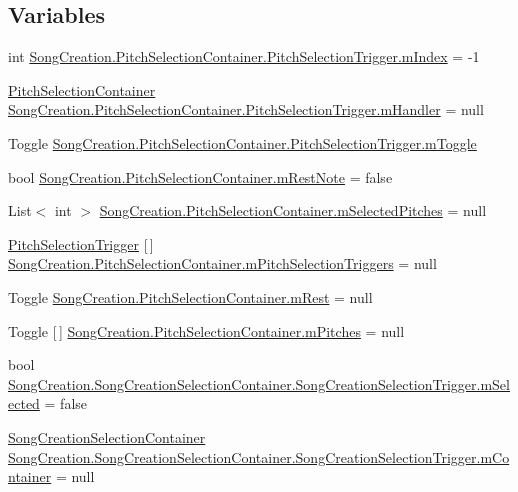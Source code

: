 \subsection*{Variables}
\begin{DoxyCompactItemize}
\item 
int \hyperlink{group___s_c_handlers_ga6fa7a0883292035fef62858a69044010}{Song\+Creation.\+Pitch\+Selection\+Container.\+Pitch\+Selection\+Trigger.\+m\+Index} = -\/1
\item 
\hyperlink{class_song_creation_1_1_pitch_selection_container}{Pitch\+Selection\+Container} \hyperlink{group___s_c_handlers_gaad92d071482ccc179c9a40cada09785b}{Song\+Creation.\+Pitch\+Selection\+Container.\+Pitch\+Selection\+Trigger.\+m\+Handler} = null
\item 
Toggle \hyperlink{group___s_c_handlers_gaa289269d96356379b79d3918535561fd}{Song\+Creation.\+Pitch\+Selection\+Container.\+Pitch\+Selection\+Trigger.\+m\+Toggle}
\item 
bool \hyperlink{group___s_c_handlers_gace289a908db9ba443c50ec8656ae05b1}{Song\+Creation.\+Pitch\+Selection\+Container.\+m\+Rest\+Note} = false
\item 
List$<$ int $>$ \hyperlink{group___s_c_handlers_ga816236cbae1f13ea34be94fb1b86b7cd}{Song\+Creation.\+Pitch\+Selection\+Container.\+m\+Selected\+Pitches} = null
\item 
\hyperlink{group___s_c_handlers_class_song_creation_1_1_pitch_selection_container_1_1_pitch_selection_trigger}{Pitch\+Selection\+Trigger} \mbox{[}$\,$\mbox{]} \hyperlink{group___s_c_handlers_ga1affedf973b4aa39505b35053c12df7e}{Song\+Creation.\+Pitch\+Selection\+Container.\+m\+Pitch\+Selection\+Triggers} = null
\item 
Toggle \hyperlink{group___s_c_handlers_ga41e99d322cb92a3eb304bef704af2b7a}{Song\+Creation.\+Pitch\+Selection\+Container.\+m\+Rest} = null
\item 
Toggle \mbox{[}$\,$\mbox{]} \hyperlink{group___s_c_handlers_ga19dbd38f92df12e9b3d52b01634fdc53}{Song\+Creation.\+Pitch\+Selection\+Container.\+m\+Pitches} = null
\item 
bool \hyperlink{group___s_c_handlers_ga49ffd4516ec7982b1683a44b4f22de74}{Song\+Creation.\+Song\+Creation\+Selection\+Container.\+Song\+Creation\+Selection\+Trigger.\+m\+Selected} = false
\item 
\hyperlink{class_song_creation_1_1_song_creation_selection_container}{Song\+Creation\+Selection\+Container} \hyperlink{group___s_c_handlers_ga23a094f17b949a4ea153f66c73e42578}{Song\+Creation.\+Song\+Creation\+Selection\+Container.\+Song\+Creation\+Selection\+Trigger.\+m\+Container} = null

\end{DoxyCompactItemize}
